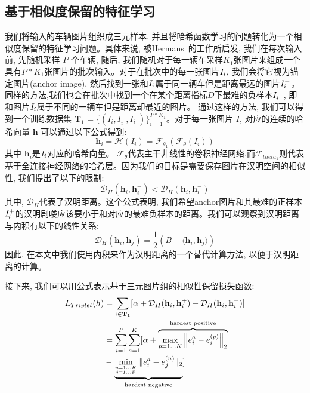 \subsection{基于相似度保留的特征学习}
我们将输入的车辆图片组织成三元样本, 并且将哈希函数学习的问题转化为一个相似度保留的特征学习问题。具体来说, 被Hermans~\cite{hermans2017defense}的工作所启发, 我们在每次输入前, 先随机采样 $P$ 个车辆, 随后, 我们随机对于每一辆车采样$K_1$张图片来组成一个具有$P*K_1$张图片的批次输入。对于在批次中的每一张图片$\it{I}_i$, 我们会将它视为锚定图片(anchor image), 然后找到一张和$\it{I}_i$属于同一辆车但是距离最远的图片$\it{I}_i^+$。同样的方法,我们也会在批次中找到一个在某个距离指标$D$下最难的负样本$\it{I}_i^-$, 即和图片$\it{I}_i$属于不同的一辆车但是距离却最近的图片。 通过这样的方法, 我们可以得到一个训练数据集 $\mathbf{T_{1}} = \{(I_i, I_i^+, I_i^-)\}_{i=1}^{P*K_1}$。对于每一张图片 $I$, 对应的连续的哈希向量 $\mathbf{h}$ 可以通过以下公式得到:
\begin{equation}
    \mathbf{h}_i = \mathcal{H}(I_i) = \mathcal{F}_{\theta_1}(\mathcal{F}_{\theta}(I_i))
\end{equation}
其中 $\mathbf{h}_i$是$\it{I}_i$对应的哈希向量。 $\mathcal{F}_{\theta}$代表主干非线性的卷积神经网络,而$\mathcal{F}_{theta_1}$则代表基于全连接神经网络的哈希层。因为我们的目标是需要保存图片在汉明空间的相似性, 我们提出了以下的限制:
\begin{equation}
    \mathcal{D}_H(\mathbf{h}_i, \mathbf{h}_i^+) < \mathcal{D}_H(\mathbf{h}_i, \mathbf{h}_i^-) 
\end{equation}
其中, $\mathcal{D}_H$代表了汉明距离。这个公式表明, 我们希望anchor图片和其最难的正样本$\it{I}_i^+$的汉明剧喽应该要小于和对应的最难负样本的距离。我们可以观察到汉明距离与内积有以下的线性关系:
\begin{equation*}
    \mathcal{D}_H(\mathbf{h}_i,\mathbf{h}_j) = \frac{1}{2}(B - \langle \mathbf{h}_i,\mathbf{h}_j \rangle)
\end{equation*}
因此, 在本文中我们使用内积来作为汉明距离的一个替代计算方法, 以便于汉明距离的计算。\par
接下来, 我们可以用公式表示基于三元图片组的相似性保留损失函数:
\begin{equation}
    \begin{array}{l}
    \begin{aligned}
    L_{Triplet} (h)
    &= \sum_{i \in \mathbf{T_{1}}} [\alpha + \mathcal{D}_{H}(\mathbf{h}_i,\mathbf{h}_i^+) - \mathcal{D}_{H}(\mathbf{h}_i, \mathbf{h}_i^-)]  \\
    &=  \sum _{i=1}^{P} \sum _{a=1}^{K}[\alpha+\overbrace{\max _{p=1 \ldots K}\left\|e_{i}^{a}-e_{i}^{(p)}\right\|_{2}}^{\text {hardest positive}}  \\
    &- 
    \underbrace{\min _{n=1 \ldots K \atop j=1 \ldots P} \|e_{i}^{a}-e_{j}^{(n)}\|_{2} }_\textrm{hardest negative}]
    \end{aligned}
    \end{array}
    \label{eq:tripletloss}
    \end{equation}
